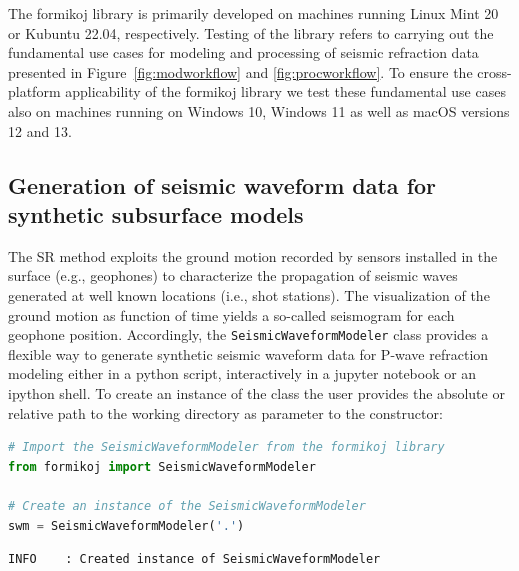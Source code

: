 \documentclass[a4paper,fleqn]{cas-sc}
\begin{document}
The formikoj library is primarily developed on machines running Linux Mint \num{20} or Kubuntu \num{22}.\num{04}, respectively. Testing of the library refers to carrying out the fundamental use cases for modeling and processing of seismic refraction data presented in Figure~\ref{fig:modworkflow} and \ref{fig:procworkflow}. To ensure the cross-platform applicability of the formikoj library we test these fundamental use cases also on machines running on Windows \num{10}, Windows \num{11} as well as macOS versions \num{12} and \num{13}.
 

\subsection{Generation of seismic waveform data for synthetic subsurface models}

The SR method exploits the ground motion recorded by sensors installed in the surface (e.g., geophones) to characterize the propagation of seismic waves generated at well known locations (i.e., shot stations). 
The visualization of the ground motion as function of time yields a so-called seismogram for each geophone position.
Accordingly, the \texttt{SeismicWaveformModeler} class provides a flexible way to generate synthetic seismic waveform data for P-wave refraction modeling either in a python script, interactively in a jupyter notebook or an ipython shell.
To create an instance of the class the user provides the absolute or relative path to the working directory as parameter to the constructor:
\begin{lstlisting}[language=Python]
# Import the SeismicWaveformModeler from the formikoj library
from formikoj import SeismicWaveformModeler

# Create an instance of the SeismicWaveformModeler
swm = SeismicWaveformModeler('.')

\end{lstlisting}

\begin{footnotesize}
\begin{verbatim}
INFO    : Created instance of SeismicWaveformModeler
\end{verbatim}
\end{footnotesize}
\end{document}

